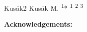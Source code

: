 
\abstract
{Kusák2} 
{Kusák M.} 
{\textsuperscript{1}*} 
{\TLtag} 
{
	\textsuperscript{1}
	\textsuperscript{2}
	\textsuperscript{3}
}
{}  %
{}
{

\vspace{0.5em}
\noindent
\textbf{Acknowledgements:}
\textit{}
}
{
}


















